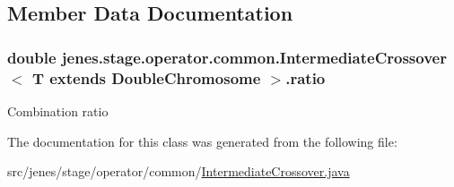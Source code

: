 \subsection{Member Data Documentation}
\hypertarget{classjenes_1_1stage_1_1operator_1_1common_1_1_intermediate_crossover_3_01_t_01extends_01_double_chromosome_01_4_a00aeef350858cb4ee81f06f7cf7a4c06}{
\subsubsection[{ratio}]{\setlength{\rightskip}{0pt plus 5cm}double jenes.\-stage.\-operator.\-common.\-Intermediate\-Crossover$<$ T extends {\bf Double\-Chromosome} $>$.ratio\hspace{0.3cm}{\ttfamily [protected]}}}\label{classjenes_1_1stage_1_1operator_1_1common_1_1_intermediate_crossover_3_01_t_01extends_01_double_chromosome_01_4_a00aeef350858cb4ee81f06f7cf7a4c06}
Combination ratio 

The documentation for this class was generated from the following file\-:\begin{DoxyCompactItemize}
\item 
src/jenes/stage/operator/common/\hyperlink{_intermediate_crossover_8java}{Intermediate\-Crossover.\-java}\end{DoxyCompactItemize}
